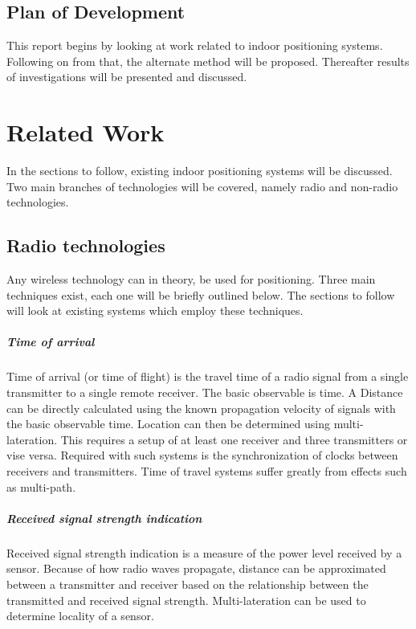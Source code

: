 \documentclass[11pt,a4paper]{report}
\begin{document}
	\section{Plan of Development}
		This report begins by looking at work related to indoor positioning systems. Following on from that, the alternate method will be proposed. Thereafter results of investigations will be presented and discussed.

\newpage
\chapter{Related Work}
	In the sections to follow, existing indoor positioning systems will be discussed. Two main branches of technologies will be covered, namely radio and non-radio technologies.
	
	\section{Radio technologies}
		Any wireless technology can in theory, be used for positioning. Three main techniques exist, each one will be briefly outlined below. The sections to follow will look at existing systems which employ these techniques.
	
	\paragraph{Time of arrival}
		Time of arrival (or time of flight) is the travel time of a radio signal from a single transmitter to a single remote receiver. The basic observable is time. A Distance can be directly calculated using the known propagation velocity of signals with the basic observable time. Location can then be determined using multi-lateration. This requires a setup of at least one receiver and three transmitters or vise versa.
		Required with such systems is the synchronization of clocks between receivers and transmitters.
		Time of travel systems suffer greatly from effects such as multi-path.
		\cite{k._pahlavan_wideband_1998}
	
	\paragraph{Received signal strength indication}
		Received signal strength indication is a measure of the power level received by a sensor. Because of how radio waves propagate, distance can be approximated between a transmitter and receiver based on the relationship between the transmitted and received signal strength. Multi-lateration can be used to determine locality of a sensor.
	
\end{document}

